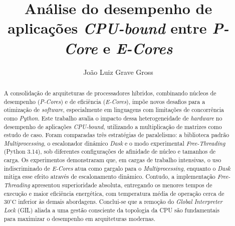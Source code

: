 \documentclass[acmsmall]{acmart}
\begin{document}
\title{Análise do desempenho de aplicações \textit{CPU-bound} entre \textit{P-Core} e \textit{E-Cores}}

\author{João Luiz Grave Gross}


\begin{abstract}
A consolidação de arquiteturas de processadores híbridos, combinando núcleos de desempenho (\textit{P-Cores}) e de eficiência (\textit{E-Cores}), impõe novos desafios para a otimização de \textit{software}, especialmente em linguagens com limitações de concorrência como \textit{Python}. Este trabalho avalia o impacto dessa heterogeneidade de \textit{hardware} no desempenho de aplicações \textit{CPU-bound}, utilizando a multiplicação de matrizes como estudo de caso. Foram comparadas três estratégias de paralelismo: a biblioteca padrão \textit{Multiprocessing}, o escalonador dinâmico \textit{Dask} e o modo experimental \textit{Free-Threading} (Python 3.14), sob diferentes configurações de afinidade de núcleo e tamanhos de carga. Os experimentos demonstraram que, em cargas de trabalho intensivas, o uso indiscriminado de \textit{E-Cores} atua como gargalo para o \textit{Multiprocessing}, enquanto o \textit{Dask} mitiga esse efeito através de escalonamento dinâmico. Contudo, a implementação \textit{Free-Threading} apresentou superioridade absoluta, entregando os menores tempos de execução e maior eficiência energética, com temperatura média de operação cerca de $30^\circ\text{C}$ inferior às demais abordagens. Conclui-se que a remoção do \textit{Global Interpreter Lock} (GIL) aliada a uma gestão consciente da topologia da CPU são fundamentais para maximizar o desempenho em arquiteturas modernas.
\end{abstract}
\end{document}
